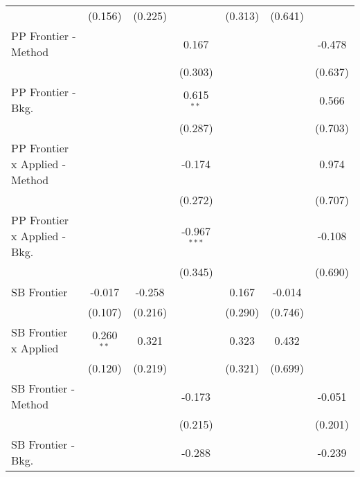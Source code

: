 \begin{tabular}{lcccccc}
                                  & (0.156)       & (0.225)        &                & (0.313)       & (0.641)      &   \\   
   PP Frontier - Method           &               &                & 0.167          &               &              & -0.478\\   
                                  &               &                & (0.303)        &               &              & (0.637)\\   
   PP Frontier - Bkg.             &               &                & 0.615$^{**}$   &               &              & 0.566\\   
                                  &               &                & (0.287)        &               &              & (0.703)\\   
   PP Frontier x Applied - Method &               &                & -0.174         &               &              & 0.974\\   
                                  &               &                & (0.272)        &               &              & (0.707)\\   
   PP Frontier x Applied - Bkg.   &               &                & -0.967$^{***}$ &               &              & -0.108\\   
                                  &               &                & (0.345)        &               &              & (0.690)\\   
   SB Frontier                    & -0.017        & -0.258         &                & 0.167         & -0.014       &   \\   
                                  & (0.107)       & (0.216)        &                & (0.290)       & (0.746)      &   \\   
   SB Frontier x Applied          & 0.260$^{**}$  & 0.321          &                & 0.323         & 0.432        &   \\   
                                  & (0.120)       & (0.219)        &                & (0.321)       & (0.699)      &   \\   
   SB Frontier - Method           &               &                & -0.173         &               &              & -0.051\\   
                                  &               &                & (0.215)        &               &              & (0.201)\\   
   SB Frontier - Bkg.             &               &                & -0.288         &               &              & -0.239\\   

\end{tabular}
